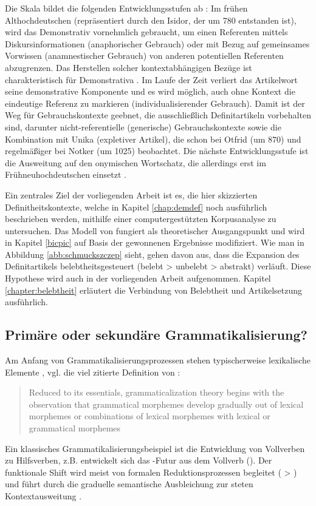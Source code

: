  
Die Skala bildet die folgenden Entwicklungsstufen ab \parencite[vgl. auch][69--78]{Szczepaniak2011a}: Im frühen Althochdeutschen (repräsentiert durch den Isidor, der um 780 entstanden ist), wird das Demonstrativ vornehmlich gebraucht, um einen Referenten mittels Diskursinformationen (anaphorischer Gebrauch) oder mit Bezug auf gemeinsames Vorwissen (anamnestischer Gebrauch) von anderen potentiellen Referenten abzugrenzen. Das Herstellen solcher kontextabhängigen Bezüge ist charakteristisch für Demonstrativa \parencite{Himmelmann1997}. Im Laufe der Zeit verliert das Artikelwort  seine demonstrative Komponente und es wird möglich, auch ohne Kontext die eindeutige Referenz zu markieren (individualisierender Gebrauch). Damit ist der Weg für Gebrauchskontexte geebnet, die ausschließlich Definitartikeln vorbehalten sind, darunter nicht-referentielle (generische) Gebrauchskontexte sowie die Kombination mit Unika (expletiver Artikel), die \parencite{Oubouzar1989,Oubouzar1992} schon bei Otfrid (um 870) und regelmäßiger bei Notker (um 1025) beobachtet. Die nächste Entwicklungsstufe ist die Ausweitung auf den onymischen Wortschatz, die allerdings erst im Frühneuhochdeutschen einsetzt \parencite{Schmuck2014}. 

Ein zentrales Ziel der vorliegenden Arbeit ist es, die hier skizzierten Definitheitskontexte, welche in Kapitel \ref{chap:demdef} noch ausführlich beschrieben werden, mithilfe einer computergestützten Korpusanalyse zu untersuchen. Das Modell von \textcite{Schmuck2014} fungiert als theoretischer Ausgangspunkt und wird in Kapitel \ref{bicpic} auf Basis der gewonnenen Ergebnisse modifiziert. Wie man in Abbildung \ref{abb:schmuckszczep} sieht, gehen \textcite{Schmuck2014} davon aus, dass die Expansion des Definitartikels belebtheitsgesteuert (belebt > unbelebt > abstrakt) verläuft. Diese Hypothese wird auch in der vorliegenden Arbeit aufgenommen. Kapitel \ref{chapter:belebtheit} erläutert die Verbindung von Belebtheit und Artikelsetzung ausführlich. 

 
\subsection{Primäre oder sekundäre Grammatikalisierung?} \label{sec:dem-quelle}

Am Anfang von Grammatikalisierungsprozessen stehen typischerweise lexikalische Elemente \parencite[vgl.][]{Heine1991,Hopper1991,Traugott1991,Bybee1994,Lehmann2015}, vgl. die viel zitierte Definition von \textcite{Bybee1994}: \blockcquote[4]{Bybee1994}{Reduced to its essentials, grammaticalization theory begins with the observation that grammatical morphemes develop gradually out of lexical morphemes or combinations of lexical morphemes with lexical or grammatical morphemes}. 
Ein klassisches Grammatikalisierungsbeispiel ist die Entwicklung von Vollverben zu Hilfsverben, z.B. entwickelt sich das -Futur aus dem Vollverb  (\cite[s.][70f.]{Heine1991}). Der funktionale Shift wird meist von formalen Reduktionsprozessen begleitet ( > ) und führt durch die graduelle semantische Ausbleichung \parencite{Heine2003} zur steten Kontextausweitung \parencite{Himmelmann2004}.  

